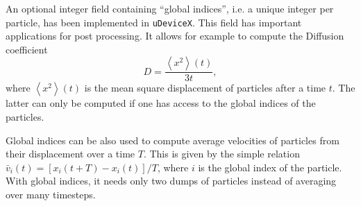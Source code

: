 An optional integer field containing ``global indices'', i.e. a unique integer per particle, has been implemented in \texttt{uDeviceX}. This field has important applications for post processing. It allows for example to compute the Diffusion coefficient
\[
D = \frac{\left< x^2 \right>(t)}{3 t},
\]
where $\left< x^2 \right>(t)$ is the mean square displacement of particles after a time $t$. The latter can only be computed if one has access to the global indices of the particles.

Global indices can be also used to compute average velocities of particles from their displacement over a time $T$. This is given by the simple relation $\bar{v}_i(t) = [x_i(t + T) - x_i(t)] / T$, where $i$ is the global index of the particle. With global indices, it needs only two dumps of particles instead of averaging over many timesteps.
